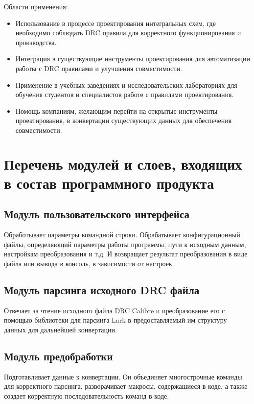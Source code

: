 Области применения:

\begin{itemize}
	\item Использование в процессе проектирования интегральных схем,
		где необходимо соблюдать DRC правила
		для корректного функционирования и производства.
	\item Интеграция в существующие инструменты проектирования
		для автоматизации работы с DRC правилами и улучшения совместимости.
	\item Применение в учебных заведениях
		и исследовательских лабораториях для обучения студентов
		и специалистов работе с правилами проектирования.
	\item Помощь компаниям, желающим перейти
		на открытые инструменты проектирования,
		в конвертации существующих данных для обеспечения совместимости.
\end{itemize}

\section{Перечень модулей и слоев, входящих в состав программного продукта}

\subsection{Модуль пользовательского интерфейса}
Обработывает параметры командной строки.
Обрабатывает конфигурационный файлы,
определяющий параметры работы программы,
пути к исходным данным, настройкам преобразования и т.д.
И возвращает результат преобразования в виде файла или вывода в консоль,
в зависимости от настроек.

\subsection{Модуль парсинга исходного DRC файла}
Отвечает за чтение исходного файла DRC Calibre
и преобразование его с помощью библиотеки для парсинга Lark
в предоставляемый им структуру данных для дальнейшей конвертации.

\subsection{Модуль предобработки}
Подготавливает данные к конвертации.
Он объединяет многострочные команды для корректного парсинга,
разворачивает макросы, содержашиеся в коде, а также
создает корректную последовательность команд в коде.

